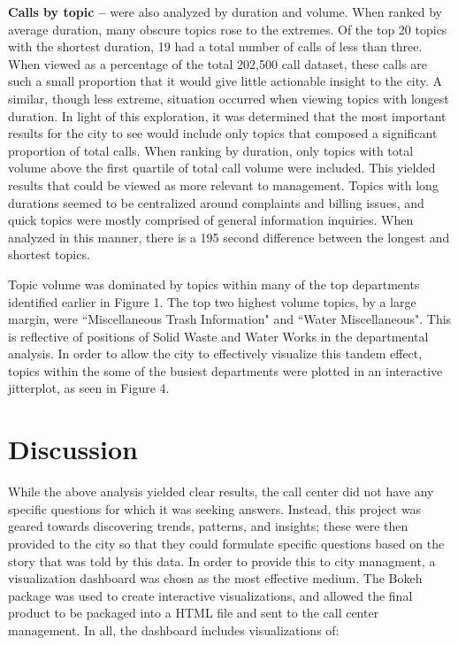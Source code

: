 \documentclass{article}
\begin{document}
\textbf{Calls by topic --} were also analyzed by duration and volume.  When ranked by average duration, many obscure topics rose to the extremes.  Of the top 20 topics with the shortest duration, 19 had a total number of calls of less than three.  When viewed as a percentage of the total 202,500 call dataset, these calls are such a small proportion that it would give little actionable insight to the city.  A similar, though less extreme, situation occurred when viewing topics with longest duration.  In light of this exploration, it was determined that the most important results for the city to see would include only topics that composed a significant proportion of total calls.  When ranking by duration, only topics with total volume above the first quartile of total call volume were included.  This yielded results that could be viewed as more relevant to management.  Topics with long durations seemed to be centralized around complaints and billing issues, and quick topics were mostly comprised of general information inquiries.  When analyzed in this manner, there is a 195 second difference between the longest and shortest topics.
\par
Topic volume was dominated by topics within many of the top departments identified earlier in Figure 1.  The top two highest volume topics, by a large margin, were ``Miscellaneous Trash Information" and ``Water Miscellaneous".  This is reflective of positions of Solid Waste and Water Works in the departmental analysis.  In order to allow the city to effectively visualize this tandem effect, topics within the some of the busiest departments were plotted in an interactive jitterplot, as seen in Figure 4.

\section{Discussion}

While the above analysis yielded clear results, the call center did not have any specific questions for which it was seeking answers.  Instead, this project was geared towards discovering trends, patterns, and insights; these were then provided to the city so that they could formulate specific questions based on the story that was told by this data.  In order to provide this to city managment, a visualization dashboard was chosn as the most effective medium.  The Bokeh package was used to create interactive visualizations, and allowed the final product to be packaged into a HTML file and sent to the call center management.  In all, the dashboard includes visualizations of:
\end{document}

